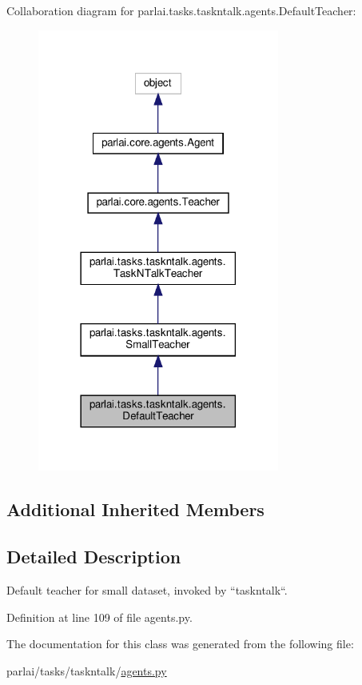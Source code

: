 Collaboration diagram for parlai.\+tasks.\+taskntalk.\+agents.\+Default\+Teacher\+:
\nopagebreak
\begin{figure}[H]
\begin{center}
\leavevmode
\includegraphics[width=225pt]{classparlai_1_1tasks_1_1taskntalk_1_1agents_1_1DefaultTeacher__coll__graph}
\end{center}
\end{figure}
\subsection*{Additional Inherited Members}


\subsection{Detailed Description}
\begin{DoxyVerb}Default teacher for small dataset, invoked by ``taskntalk``.\end{DoxyVerb}
 

Definition at line 109 of file agents.\+py.



The documentation for this class was generated from the following file\+:\begin{DoxyCompactItemize}
\item 
parlai/tasks/taskntalk/\hyperlink{parlai_2tasks_2taskntalk_2agents_8py}{agents.\+py}\end{DoxyCompactItemize}
